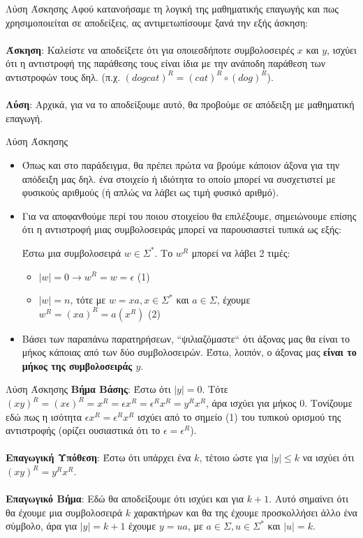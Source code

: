 \documentclass[size=14pt, paper=smartboard, style=fyma, mode=present]{powerdot}
\begin{document}
\begin{slide}[toc=]{Λύση Άσκησης}
{\large 	Αφού κατανοήσαμε τη λογική της μαθηματικής επαγωγής και πως χρησιμοποιείται σε αποδείξεις, ας αντιμετωπίσουμε ξανά την εξής άσκηση: \\~\\
	\textbf{Άσκηση}: Καλείστε να αποδείξετε ότι για οποιεσδήποτε συμβολοσειρές $x$ και $y$, ισχύει ότι η αντιστροφή της παράθεσης τους είναι ίδια με την ανάποδη παράθεση των αντιστροφών τους δηλ.  \unboldmath (π.χ. $(dogcat)^R = (cat)^R \circ (dog)^R$).
	\\~\\
	\textbf{Λύση}: Αρχικά, για να το αποδείξουμε αυτό, θα προβούμε σε απόδειξη με μαθηματική επαγωγή.	}
\end{slide}
\begin{slide}[toc=]{Λύση Άσκησης}
{\large
	\begin{itemize}
		\item Όπως και στο παράδειγμα, θα πρέπει πρώτα να βρούμε κάποιον άξονα για την απόδειξη μας δηλ. ένα στοιχείο ή ιδιότητα το οποίο μπορεί να συσχετιστεί με φυσικούς αριθμούς (ή απλώς να λάβει ως τιμή φυσικό αριθμό).
		\item Για να αποφανθούμε περί του ποιου στοιχείου θα επιλέξουμε, σημειώνουμε επίσης ότι η αντιστροφή μιας συμβολοσειράς μπορεί να παρουσιαστεί τυπικά ως εξής:
		\begin{center}
			Έστω μια συμβολοσειρά $w \in \Sigma^*$. Το $w^R$ μπορεί να λάβει 2 τιμές:
			\begin{itemize}
				\item $|w| = 0 \to w^R=w=\epsilon$ (1)
				\item $|w| = n$, τότε με $w=xa, x\in \Sigma^*$ και $a \in \Sigma$, έχουμε $w^R=(xa)^R=a(x^R)$ (2)
			\end{itemize}
		\end{center}
		\item Βάσει των παραπάνω παρατηρήσεων, ``ψιλιαζόμαστε`` ότι άξονας μας θα είναι το μήκος κάποιας από των δύο συμβολοσειρών. Έστω, λοιπόν, ο άξονας μας \textbf{είναι το μήκος της συμβολοσειράς $y$}.
	\end{itemize}
}
\end{slide}
\begin{slide}[toc=]{Λύση Άσκησης}
	{\large \textbf{Βήμα Βάσης}: Έστω ότι $|y|=0$. Τότε $(xy)^R = (x\epsilon)^R  = x^R  =  \epsilon x^R = \epsilon^R x^R = y^Rx^R$, άρα ισχύει για μήκος 0. Τονίζουμε εδώ πως η ισότητα $ \epsilon x^R = \epsilon^R x^R $ ισχύει από το σημείο (1) του τυπικού ορισμού της αντιστροφής (ορίζει ουσιαστικά ότι το $\epsilon = \epsilon^R$).  }
	\\~\\ \pause
	{\large \textbf{Επαγωγική Υπόθεση}: Έστω ότι υπάρχει ένα $k$, τέτοιο ώστε για $|y| \le k$ να ισχύει ότι $(xy)^R = y^Rx^R$.
	}
	\\~\\ \pause
	{\large \textbf{Επαγωγικό Βήμα}: Εδώ θα αποδείξουμε ότι ισχύει και για $k+1$. Αυτό σημαίνει ότι θα έχουμε μια συμβολοσειρά $k$ χαρακτήρων και θα της έχουμε προσκολλήσει άλλο ένα σύμβολο, άρα για $|y|=k+1$ έχουμε $y=ua$, με $a \in \Sigma, u \in \Sigma^*$ και $|u|=k$.
	}
\end{slide}
\end{document}
